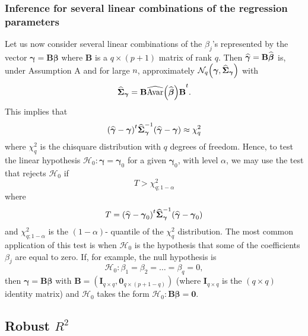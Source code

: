 \subsubsection{Inference for several linear combinations of the regression
parameters}

Let us now consider several linear combinations of the $\beta_{j}$'s
represented by the vector $\boldsymbol{\gamma}=\mathbf{B}\boldsymbol\beta$
where $\mathbf{B}$ is a $q\times(p+1)$ matrix of rank $q$. Then $\widehat
{\boldsymbol{\gamma}}=\mathbf{B}\widehat{\boldsymbol\beta}$ is, under
Assumption A and for large $n$, approximately $\mathcal{N}_{q}\left(
\boldsymbol{\gamma},\sthat{\boldsymbol{\Sigma}}_{\boldsymbol{\gamma}%
}\right)  $ with
\[
\sthat{\boldsymbol{\Sigma}}_{\boldsymbol{\gamma}}=\mathbf{B\widehat
{\mathrm{Avar}}\left(  \sthat{\boldsymbol\beta}\right)  B}^{t}.
\]
This implies that
\[
\left(  \sthat{\boldsymbol{\gamma}}-\boldsymbol{\gamma}\right)  ^{t}%
\sthat{\boldsymbol{\Sigma}}_{\boldsymbol{\gamma}}^{-1}\left(  \widehat
{\boldsymbol{\gamma}}-\boldsymbol{\gamma}\right)  \approx\chi_{q}^{2}%
\]
where $\chi_{q}^{2}$ is the chisquare distribution with $q$ degrees of
freedom. Hence, to test the linear hypothesis $\mathcal{H}_{0}%
:\boldsymbol{\gamma}=\boldsymbol{\gamma}_{0}$ for a given $\boldsymbol{\gamma
}_{0}$, with level $\alpha$, we may use the test that rejects $\mathcal{H}%
_{0}$ if
\[
T>\chi_{q;1-\alpha}^{2}%
\]
where
\[
T=\left(  \sthat{\boldsymbol{\gamma}}-\boldsymbol{\gamma}_{0}\right)
^{t}\sthat{\boldsymbol{\Sigma}}_{\boldsymbol{\gamma}}^{-1}\left(
\sthat{\boldsymbol{\gamma}}-\boldsymbol{\gamma}_{0}\right)
\]
and $\chi_{q;1-\alpha}^{2}$ is the $\left(  1-\alpha\right)  $- quantile of
the $\chi_{q}^{2}$ distribution. The most common application of this test is
when $\mathcal{H}_{0}$ is the hypothesis that some of the coefficients
$\beta_{j}$ are equal to zero. If, for example, the null hypothesis is
\[
\mathcal{H}_{0}:\beta_{1}=\beta_{2}=\ldots=\beta_{q}=0,
\]
then $\boldsymbol{\gamma}=\mathbf{B}\boldsymbol\beta$ with $\mathbf{B}%
=\left(  \mathbf{I}_{q\times q},\mathbf{0}_{q\times\left(  p+1-q\right)
}\right)  $ (where $\mathbf{I}_{q\times q}$ is the $(q\times q)$ identity
matrix) and $\mathcal{H}_{0}$ takes the form $\mathcal{H}_{0}:\mathbf{B}%
\boldsymbol{\beta=0}$.

\subsection{Robust $R^{2}$}

